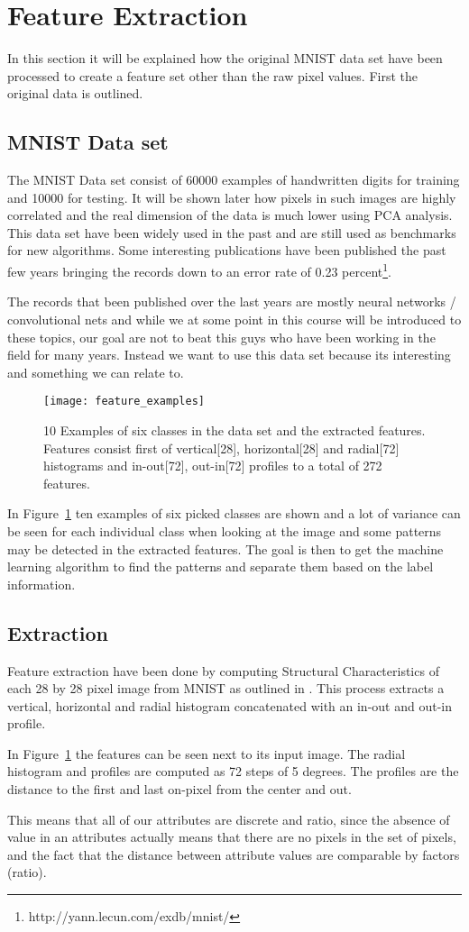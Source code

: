\section{Feature Extraction}
In this section it will be explained how the original MNIST data set have been processed to create a feature set other than the raw pixel values. First the original data is outlined.
\subsection{MNIST Data set}
The MNIST Data set consist of 60000 examples of handwritten digits for training and 10000 for testing. It will be shown later how pixels in such images are highly correlated and the real dimension of the data is much lower using PCA analysis.
This data set have been widely used in the past and are still used as benchmarks for new algorithms. Some interesting publications have been published the past few years bringing the records down to an error rate of 0.23 percent\footnote{http://yann.lecun.com/exdb/mnist/}.

The records that been published over the last years are mostly neural networks / convolutional  nets and while we at some point in this course will be introduced to these topics, our goal are not to beat this guys who have been working in the field for many years. Instead we want to use this data set because its interesting and something we can relate to.


\begin{figure}[H]
\centering
\texttt{[image: feature\_examples]}
\caption{10 Examples of six classes in the data set and the extracted features. Features consist first of vertical[28], horizontal[28] and radial[72] histograms and in-out[72], out-in[72] profiles to a total of 272 features. \label{fig:image_examples}}
\end{figure}

In Figure~\ref{fig:image_examples} ten examples of six picked classes are shown and a lot of variance can be seen for each individual class when looking at the image and some patterns may be detected in the extracted features. The goal is then to get the machine learning algorithm to find the patterns and separate them based on the label information.
\subsection{Extraction}
Feature extraction have been done by computing Structural Characteristics of each 28 by 28 pixel image from MNIST as outlined in \cite{1227727}. This process extracts a vertical, horizontal and radial histogram concatenated with an in-out and out-in profile.

In Figure~\ref{fig:image_examples} the features can be seen next to its input image. The radial histogram and profiles are computed as 72 steps of 5 degrees. The profiles are the distance to the first and last on-pixel from the center and out. 

This means that all of our attributes are discrete and ratio, since the absence of value in an attributes actually means that there are no pixels in the set of pixels, and the fact that the distance between attribute values are comparable by factors (ratio).
